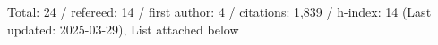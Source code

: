 Total: 24 / refereed: 14 / first author: 4 / citations: 1,839 / h-index: 14 (Last updated: 2025-03-29), List attached below
